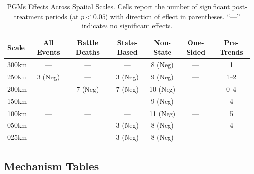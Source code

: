\documentclass[11pt]{article}
\begin{document}






\begin{table}[H]
\centering
\caption{PGMs Effects Across Spatial Scales. Cells report the number of significant post-treatment periods (at $p<0.05$) with direction of effect in parentheses. ``---'' indicates no significant effects.}
\label{tab:pgms_robustness}
\begin{tabular}{lcccccc}
\toprule
Scale & All Events & Battle Deaths & State-Based & Non-State & One-Sided & Pre-Trends \\
\midrule
300km & ---       & ---           & ---         & 8 (Neg)   & ---       & 1          \\
250km & 3 (Neg)   & ---           & 3 (Neg)     & 9 (Neg)   & ---       & 1--2       \\
200km & ---       & 7 (Neg)       & 7 (Neg)     & 10 (Neg)  & ---       & 0--4       \\
150km & ---       & ---           & ---         & 9 (Neg)   & ---       & 4          \\
100km & ---       & ---           & ---         & 11 (Neg)  & ---       & 5          \\
050km & ---       & ---           & 3 (Neg)     & 8 (Neg)   & ---       & 4          \\
025km & ---       & ---           & 3 (Neg)     & 8 (Neg)   & ---       & ---        \\
\bottomrule
\end{tabular}
\end{table}

\subsection{Mechanism Tables}






\end{document}

